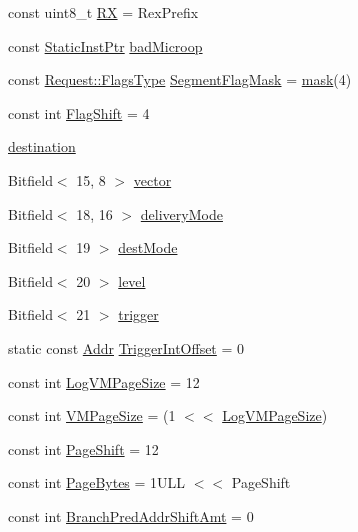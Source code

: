 \begin{DoxyCompactItemize}
\item 
const uint8\_\-t \hyperlink{namespaceX86ISA_a58d754bc1e9db1b928a4aa7bb958abf1}{RX} = RexPrefix
\item 
const \hyperlink{classRefCountingPtr}{StaticInstPtr} \hyperlink{namespaceX86ISA_ad81a1662d6261445c39468b0e178289c}{badMicroop}
\item 
const \hyperlink{classRequest_a2da503161d95c65aea559dbabcf570aa}{Request::FlagsType} \hyperlink{namespaceX86ISA_a77dc1966203d85366152637f9b44877f}{SegmentFlagMask} = \hyperlink{namespaceX86ISA_a5d76cc2129e79ba1941d2cc2f53b9e8e}{mask}(4)
\item 
const int \hyperlink{namespaceX86ISA_aa3993f768fd6f39c79856c9039c7523f}{FlagShift} = 4
\item 
\hyperlink{namespaceX86ISA_a78018be0196ca47c5ce84ad62a0d4dba}{destination}
\item 
Bitfield$<$ 15, 8 $>$ \hyperlink{namespaceX86ISA_a7ea82552101f041fad7635b3ed036a84}{vector}
\item 
Bitfield$<$ 18, 16 $>$ \hyperlink{namespaceX86ISA_a34b0ef8281faabd4b541199a582a889d}{deliveryMode}
\item 
Bitfield$<$ 19 $>$ \hyperlink{namespaceX86ISA_a22d205987d2a9bb2d06283f2cb5b1b22}{destMode}
\item 
Bitfield$<$ 20 $>$ \hyperlink{namespaceX86ISA_a66adbc3470a30c6702194c0e48f2225d}{level}
\item 
Bitfield$<$ 21 $>$ \hyperlink{namespaceX86ISA_a23ab51ec25f2500855e38a8fb465e451}{trigger}
\item 
static const \hyperlink{base_2types_8hh_af1bb03d6a4ee096394a6749f0a169232}{Addr} \hyperlink{namespaceX86ISA_af066cba0bd7ddf4112536139f15c0804}{TriggerIntOffset} = 0
\item 
const int \hyperlink{namespaceX86ISA_a554fef169d109a5ccb7ce0dd6a43e521}{LogVMPageSize} = 12
\item 
const int \hyperlink{namespaceX86ISA_a891eaf95159d764e6efae501c2860a3a}{VMPageSize} = (1 $<$$<$ \hyperlink{namespaceX86ISA_a554fef169d109a5ccb7ce0dd6a43e521}{LogVMPageSize})
\item 
const int \hyperlink{namespaceX86ISA_a500ead3838797254da115aeeff14aaa5}{PageShift} = 12
\item 
const int \hyperlink{namespaceX86ISA_a7a804a2139c455999786dede70a4467b}{PageBytes} = 1ULL $<$$<$ PageShift
\item 
const int \hyperlink{namespaceX86ISA_a518c446960e93d236b89246eabc20298}{BranchPredAddrShiftAmt} = 0
\item 

\end{DoxyCompactItemize}
